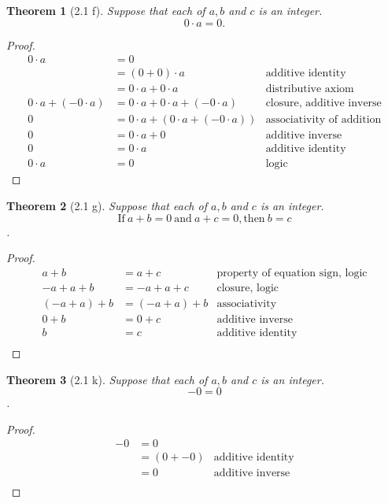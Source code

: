 \documentclass[12pt,std, fleqn]{article}
\newtheorem{theorem} {Theorem}
\begin{document}
\begin{theorem}[2.1 f] Suppose that each of $a, b$ and $c$ is an integer.
$$0 \cdot a = 0.$$
\end{theorem}

\begin{proof} 
\begin{align*}
0 \cdot a &= 0 \\
        &= (0 + 0) \cdot a  & \text{additive identity}\\
        &= 0\cdot a + 0 \cdot a & \text{distributive axiom} \\
0 \cdot a + (-0\cdot a) &= 0\cdot a + 0 \cdot a + (-0\cdot a) & \text{closure, additive inverse} \\
     0  &= 0\cdot a + (0 \cdot a + (-0\cdot a)) & \text{associativity of addition}\\
     0  &= 0\cdot a + 0 & \text{additive inverse} \\
     0  &= 0 \cdot a & \text{additive identity}\\
 0 \cdot a  &= 0 &\text{logic}
\end{align*}
\end{proof}

\begin{theorem}[2.1 g] Suppose that each of $a, b$ and $c$ is an integer.
$$ \mbox{If}\  a+b = 0\  \mbox{and}\  a+c=0, \mbox{then}\  b=c $$.
\end{theorem}
\vspace{-1 cm}

\begin{proof} 
\begin{align*}
a + b &= a + c & \text{property of equation sign, logic}\\
-a + a + b &= -a + a + c  & \text{closure, logic}\\
(-a + a) + b &= (-a + a) + b & \text{associativity} \\
0 + b &= 0 + c  & \text{additive inverse} \\
   b  &= c & \text{additive identity}\\
\end{align*}
\end{proof}
\pagebreak

\begin{theorem}[2.1 k] Suppose that each of $a, b$ and $c$ is an integer.
$$ -0 = 0 $$.
\end{theorem}
\vspace{-1 cm}

\begin{proof} 
\begin{align*}
-0 &= 0 \\
   &= (0 + -0)  & \text{additive identity}\\
&= 0 & \text{additive inverse} \\
\end{align*}
\end{proof}
\end{document}
